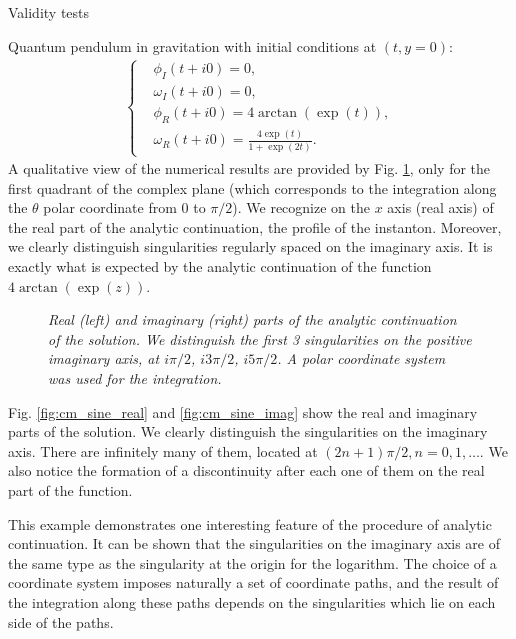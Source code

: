 \begin{section}{Validity tests}
\begin{subsection}{Quantum pendulum in gravitation}
    with initial conditions at $(t,y=0)$:
    \begin{align}
      \left\{
      \begin{aligned}
        &\phi_I(t+i0) = 0,\\
        &\omega_I(t+i0) = 0,\\
        &\phi_R(t+i0) = 4\arctan(\exp(t)),\\
        &\omega_R(t+i0) = \frac{4\exp(t)}{1+\exp(2t)}.
      \end{aligned}
      \right.
    \end{align}
    A qualitative view of the numerical results are provided by
    Fig. \ref{fig:3d_sine}, only for the first quadrant of the complex
    plane (which corresponds to the integration along the $\theta$
    polar coordinate from $0$ to $\pi/2$). We recognize on the $x$
    axis (real axis) of the real part of the analytic continuation,
    the profile of the instanton. Moreover, we clearly distinguish
    singularities regularly spaced on the imaginary axis. It is
    exactly what is expected by the analytic continuation of the
    function $4\arctan(\exp(z))$.

    \begin{figure}[!ht]
      \begin{center}
        
        
        \caption{\em Real (left) and imaginary (right) parts of the
          analytic continuation of the solution. We distinguish the
          first 3 singularities on the positive imaginary axis, at
          $i\pi/2$, $i3\pi/2$, $i5\pi/2$. A polar coordinate system was
          used for the integration.}
        \label{fig:3d_sine}
      \end{center}
    \end{figure}

    Fig. \ref{fig:cm_sine_real} and \ref{fig:cm_sine_imag} show the real and imaginary parts of the solution. We clearly distinguish the singularities on the
    imaginary axis. There are infinitely many of them, located at
    $(2n+1)\pi/2, n=0,1,\dots$. We also notice the formation of a
    discontinuity after each one of them on the real part of the
    function.

    This example demonstrates one interesting feature of the
    procedure of analytic continuation. It can be shown that the
    singularities on the imaginary axis are of the same type as the
    singularity at the origin for the logarithm. The choice of a
    coordinate system imposes naturally a set of coordinate paths, and
    the result of the integration along these paths depends on the
    singularities which lie on each side of the paths.


\end{subsection}
\end{section}

